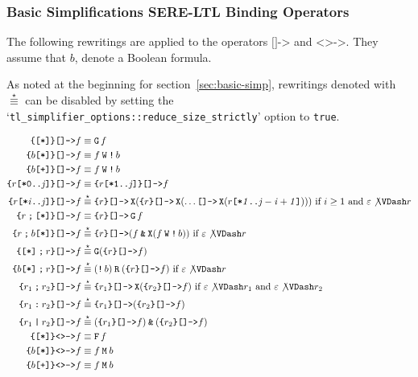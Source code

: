 \documentclass[a4paper,twoside,10pt,DIV=12]{scrreprt}
\DeclareMathOperator{\F}{\texttt{F}}
\DeclareMathOperator{\G}{\texttt{G}}
\newcommand{\R}{\mathbin{\texttt{R}}}
\DeclareMathOperator{\X}{\texttt{X}}
\newcommand{\M}{\mathbin{\texttt{M}}}
\newcommand{\W}{\mathbin{\texttt{W}}}
\DeclareMathOperator{\NOT}{\texttt{!}}
\newcommand{\OR}{\mathbin{\texttt{|}}}
\newcommand{\AND}{\mathbin{\texttt{\&}}}
\newcommand{\FUSION}{\mathbin{\texttt{:}}}
\newcommand{\CONCAT}{\mathbin{\texttt{;}}}
\newcommand{\0}{\texttt{0}}
\newcommand{\1}{\texttt{1}}
\newcommand{\STAR}[1]{\texttt{[*#1]}}
\newcommand{\PLUS}{\texttt{[+]}}
\newcommand{\Esuffix}{\texttt{<>->}}
\newcommand{\Asuffix}{\texttt{[]->}}
\newcommand{\sere}[1]{\texttt{\{}#1\texttt{\}}}
\newcommand{\equiV}{\stackrel{\star}{\equiv}}
\newcommand\mvar[1]{\ensuremath{\mathit{#1}}}
\begin{document}
\subsubsection{Basic Simplifications SERE-LTL Binding Operators}

The following rewritings are applied to the operators $\Asuffix$ and
$\Esuffix$.  They assume that $b$, denote a Boolean formula.

As noted at the beginning for section~\ref{sec:basic-simp}, rewritings
denoted with $\equiV$ can be disabled by setting the
`\verb|tl_simplifier_options::reduce_size_strictly|' option to
\texttt{true}.

\begin{align*}
  \sere{\STAR{}}\Asuffix f &\equiv \G f\\
  \sere{b\STAR{}}\Asuffix f &\equiv f \W \NOT b\\
  \sere{b\PLUS{}}\Asuffix f &\equiv f \W \NOT b\\
  \sere{r\STAR{0..\mvar{j}}}\Asuffix f &\equiv \sere{r\STAR{1..\mvar{j}}}\Asuffix f \\
  \sere{r\STAR{\mvar{i}..\mvar{j}}}\Asuffix f &\equiV
    \sere{r}\Asuffix \X(
    \sere{r}\Asuffix \X(\ldots
    \Asuffix\X(r\STAR{\mvar{1}..\mvar{j-i+1}})))
    \text{~if~}i\ge 1\text{~and~}\varepsilon\not\VDash r\\
  \sere{r\CONCAT \STAR{}}\Asuffix f &\equiv \sere{r}\Asuffix \G f\\
  \sere{r\CONCAT b\STAR{}}\Asuffix f &\equiV \sere{r}\Asuffix (f\AND \X(f \W \NOT b)) \text{~if~}\varepsilon\not\VDash r\\
  \sere{\STAR{}\CONCAT r}\Asuffix f &\equiV \G(\sere{r}\Asuffix f)\\
  \sere{b\STAR{}\CONCAT r}\Asuffix f &\equiV (\NOT b)\R(\sere{r}\Asuffix f) \text{~if~}\varepsilon\not\VDash r\\
  \sere{r_1\CONCAT r_2}\Asuffix f &\equiV \sere{r_1}\Asuffix\X(\sere{r_2}\Asuffix f)\text{~if~}\varepsilon\not\VDash r_1\text{~and~}\varepsilon\not\VDash r_2\\
  \sere{r_1\FUSION r_2}\Asuffix f &\equiV \sere{r_1}\Asuffix(\sere{r_2}\Asuffix f)\\
  \sere{r_1\OR r_2}\Asuffix f &\equiV (\sere{r_1}\Asuffix f)\AND(\sere{r_2}\Asuffix f)\\
  \sere{\STAR{}}\Esuffix f &\equiv \F f\\
  \sere{b\STAR{}}\Esuffix f &\equiv f \M b\\
  \sere{b\PLUS{}}\Esuffix f &\equiv f \M b\\

\end{align*}
\end{document}
